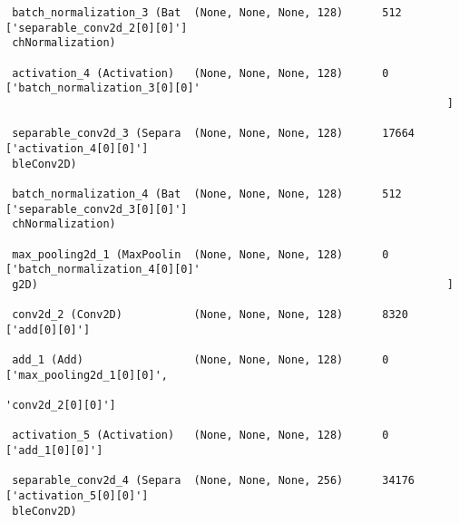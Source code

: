 \documentclass[
  letterpaper,
  DIV=11,
  numbers=noendperiod]{scrreprt}
\begin{document}
\begin{verbatim}
 batch_normalization_3 (Bat  (None, None, None, 128)      512       ['separable_conv2d_2[0][0]']  
 chNormalization)                                                                                 
                                                                                                  
 activation_4 (Activation)   (None, None, None, 128)      0         ['batch_normalization_3[0][0]'
                                                                    ]                             
                                                                                                  
 separable_conv2d_3 (Separa  (None, None, None, 128)      17664     ['activation_4[0][0]']        
 bleConv2D)                                                                                       
                                                                                                  
 batch_normalization_4 (Bat  (None, None, None, 128)      512       ['separable_conv2d_3[0][0]']  
 chNormalization)                                                                                 
                                                                                                  
 max_pooling2d_1 (MaxPoolin  (None, None, None, 128)      0         ['batch_normalization_4[0][0]'
 g2D)                                                               ]                             
                                                                                                  
 conv2d_2 (Conv2D)           (None, None, None, 128)      8320      ['add[0][0]']                 
                                                                                                  
 add_1 (Add)                 (None, None, None, 128)      0         ['max_pooling2d_1[0][0]',     
                                                                     'conv2d_2[0][0]']            
                                                                                                  
 activation_5 (Activation)   (None, None, None, 128)      0         ['add_1[0][0]']               
                                                                                                  
 separable_conv2d_4 (Separa  (None, None, None, 256)      34176     ['activation_5[0][0]']        
 bleConv2D)                                                                                       
                                                                                                  

\end{verbatim}
\end{document}

